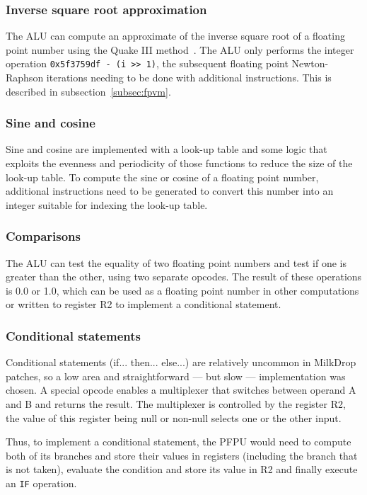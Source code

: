 \documentclass[a4paper,11pt]{kthesis}
\begin{document}
\subsubsection{Inverse square root approximation}
The ALU can compute an approximate of the inverse square root of a floating point number using the Quake III method~\cite{invsqrt}. The ALU only performs the integer operation \verb!0x5f3759df - (i >> 1)!, the subsequent floating point Newton-Raphson iterations needing to be done with additional instructions. This is described in subsection~\ref{subsec:fpvm}.

\subsubsection{Sine and cosine}
Sine and cosine are implemented with a look-up table and some logic that exploits the evenness and periodicity of those functions to reduce the size of the look-up table. To compute the sine or cosine of a floating point number, additional instructions need to be generated to convert this number into an integer suitable for indexing the look-up table.

\subsubsection{Comparisons}
The ALU can test the equality of two floating point numbers and test if one is greater than the other, using two separate opcodes. The result of these operations is 0.0 or 1.0, which can be used as a floating point number in other computations or written to register R2 to implement a conditional statement.

\subsubsection{Conditional statements}
Conditional statements (if... then... else...) are relatively uncommon in MilkDrop patches, so a low area and straightforward --- but slow --- implementation was chosen. A special opcode enables a multiplexer that switches between operand A and B and returns the result. The multiplexer is controlled by the register R2, the value of this register being null or non-null selects one or the other input.

Thus, to implement a conditional statement, the PFPU would need to compute both of its branches and store their values in registers (including the branch that is not taken), evaluate the condition and store its value in R2 and finally execute an \verb!IF! operation.
\end{document}
